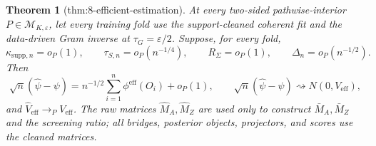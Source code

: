 \documentclass{article}
\newtheorem{theorem}{Theorem}
\begin{document}
\begin{theorem}[thm:8-efficient-estimation]\label{thm:8-efficient-estimation}
At every two-sided pathwise-interior \(P\in\mathcal M_{K,\varepsilon}\), let every training fold use the support-cleaned coherent fit and the data-driven Gram inverse at \(\tau_G=\varepsilon/2\).  Suppose, for every fold,
\[
 \kappa_{\mathrm{supp},n}=o_P(1),
 \qquad \tau_{S,n}=o_P(n^{-1/4}),
 \qquad R_\Sigma=o_P(1),
 \qquad \Delta_n=o_P(n^{-1/2}).
\]
Then
\[
 \sqrt n(\widehat\psi-\psi)
 =n^{-1/2}\sum_{i=1}^n\phi^{\mathrm{eff}}(O_i)+o_P(1),
 \qquad
 \sqrt n(\widehat\psi-\psi)\rightsquigarrow N(0,V_{\mathrm{eff}}),
\]
and \(\widehat V_{\mathrm{eff}}\to_PV_{\mathrm{eff}}\).  The raw matrices \(\widehat M_A,\widehat M_Z\) are used only to construct \(\bar M_A,\bar M_Z\) and the screening ratio; all bridges, posterior objects, projectors, and scores use the cleaned matrices.
\end{theorem}
\end{document}
